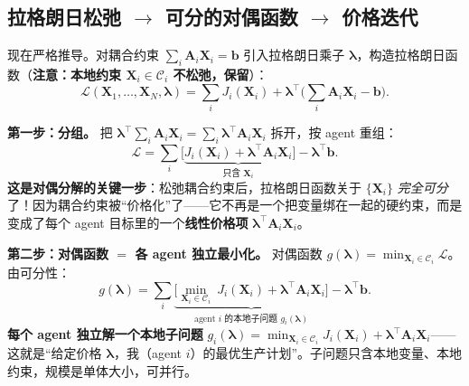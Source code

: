 \subsection{拉格朗日松弛 $\to$ 可分的对偶函数 $\to$ 价格迭代}
\label{sec:dmpc-dual-derive}

现在严格推导。对耦合约束 $\sum_i \mathbf{A}_i\mathbf{X}_i=\mathbf{b}$ 引入拉格朗日乘子 $\boldsymbol{\lambda}$，构造拉格朗日函数（\textbf{注意：本地约束 $\mathbf{X}_i\in\mathcal{C}_i$ 不松弛，保留}）：
\begin{equation}
  \mathcal{L}(\mathbf{X}_1,\dots,\mathbf{X}_N,\boldsymbol{\lambda}) = \sum_i J_i(\mathbf{X}_i) + \boldsymbol{\lambda}^\top\Big(\sum_i \mathbf{A}_i\mathbf{X}_i-\mathbf{b}\Big).
  \label{eq:dmpc-lagrangian}
\end{equation}

\textbf{第一步：分组。} 把 $\boldsymbol{\lambda}^\top\sum_i \mathbf{A}_i\mathbf{X}_i=\sum_i\boldsymbol{\lambda}^\top \mathbf{A}_i\mathbf{X}_i$ 拆开，按 agent 重组：
\begin{equation}
  \mathcal{L} = \sum_i\big[\underbrace{J_i(\mathbf{X}_i)+\boldsymbol{\lambda}^\top \mathbf{A}_i\mathbf{X}_i}_{\text{只含 }\mathbf{X}_i}\big] - \boldsymbol{\lambda}^\top\mathbf{b}.
  \label{eq:dmpc-lagrangian-split}
\end{equation}
\textbf{这是对偶分解的关键一步}：松弛耦合约束后，拉格朗日函数关于 $\{\mathbf{X}_i\}$ \emph{完全可分}了！因为耦合约束被“价格化”了——它不再是一个把变量绑在一起的硬约束，而是变成了每个 agent 目标里的一个\textbf{线性价格项} $\boldsymbol{\lambda}^\top \mathbf{A}_i\mathbf{X}_i$。

\textbf{第二步：对偶函数 $=$ 各 agent 独立最小化。} 对偶函数 $g(\boldsymbol{\lambda})=\min_{\mathbf{X}_i\in\mathcal{C}_i}\mathcal{L}$。由可分性：
\begin{equation}
  g(\boldsymbol{\lambda}) = \sum_i\underbrace{\Big[\min_{\mathbf{X}_i\in\mathcal{C}_i}\ J_i(\mathbf{X}_i)+\boldsymbol{\lambda}^\top \mathbf{A}_i\mathbf{X}_i\Big]}_{\text{agent }i\text{ 的本地子问题 }g_i(\boldsymbol{\lambda})} - \boldsymbol{\lambda}^\top\mathbf{b}.
  \label{eq:dmpc-dualfunc}
\end{equation}
\textbf{每个 agent 独立解一个本地子问题} $g_i(\boldsymbol{\lambda})=\min_{\mathbf{X}_i\in\mathcal{C}_i}J_i(\mathbf{X}_i)+\boldsymbol{\lambda}^\top \mathbf{A}_i\mathbf{X}_i$——这就是“给定价格 $\boldsymbol{\lambda}$，我（agent $i$）的最优生产计划”。子问题只含本地变量、本地约束，规模是单体大小，可并行。

